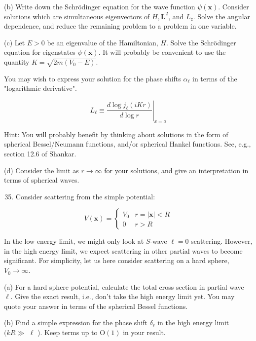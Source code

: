 \documentclass[10pt]{article}
\begin{document}
(b) Write down the Schrödinger equation for the wave function $\psi(\mathbf{x})$. Consider solutions which are simultaneous eigenvectors of $H, \mathbf{L}^{2}$, and $L_{z}$. Solve the angular dependence, and reduce the remaining problem to a problem in one variable.

(c) Let $E>0$ be an eigenvalue of the Hamiltonian, $H$. Solve the Schrödinger equation for eigenstates $\psi(\mathbf{x})$. It will probably be convenient to use the quantity $K=\sqrt{2 m\left(V_{0}-E\right)}$.

You may wish to express your solution for the phase shifts $\alpha_{\ell}$ in terms of the "logarithmic derivative".


\begin{equation*}
\left.L_{\ell} \equiv \frac{d \log j_{\ell}(i K r)}{d \log r}\right|_{x=a} \tag{8}
\end{equation*}


Hint: You will probably benefit by thinking about solutions in the form of spherical Bessel/Neumann functions, and/or spherical Hankel functions. See, e.g., section 12.6 of Shankar.

(d) Consider the limit as $r \rightarrow \infty$ for your solutions, and give an interpretation in terms of spherical waves.

\begin{enumerate}
  \setcounter{enumi}{34}
  \item Consider scattering from the simple potential:
\end{enumerate}

$$
V(\mathbf{x})= \begin{cases}V_{0} & r=|\mathbf{x}|<R \\ 0 & r>R\end{cases}
$$

In the low energy limit, we might only look at $S$-wave $\ell=0$ scattering. However, in the high energy limit, we expect scattering in other partial waves to become significant. For simplicity, let us here consider scattering on a hard sphere, $V_{0} \rightarrow \infty$.

(a) For a hard sphere potential, calculate the total cross section in partial wave $\ell$. Give the exact result, i.e., don't take the high energy limit yet. You may quote your answer in terms of the spherical Bessel functions.

(b) Find a simple expression for the phase shift $\delta_{\ell}$ in the high energy limit $(k R \gg$ $\ell$ ). Keep terms up to $\mathrm{O}(1)$ in your result.
\end{document}
